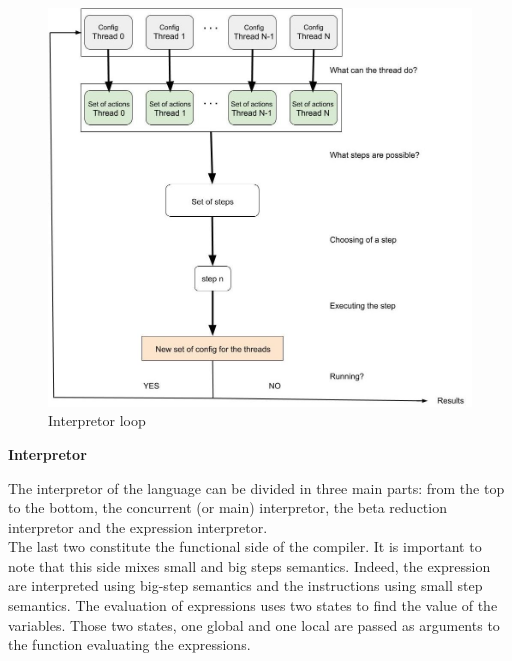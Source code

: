 \documentclass[11pt]{report}
\begin{document}
\begin{figure}[htbp]
\centering
\includegraphics[scale = 0.4]{Interpretor_loop.jpg}
\caption{Interpretor loop}
\end{figure}

\newpage

{}
\centerline{\textbf{\Huge Interpretor}}
\vspace*{15pt}

{}
\vspace*{3pt}
\vspace*{10pt}

\tabto{1cm}The interpretor of the language can be divided in three main parts: from the top to the bottom, the concurrent (or main) interpretor, the beta reduction interpretor and the expression interpretor. \\

\tabto{1cm}The last two constitute the functional side of the compiler. It is important to note that this side mixes small and big steps semantics. Indeed, the expression are interpreted using big-step semantics and the instructions using small step semantics. The evaluation of expressions uses two states to find the value of the variables. Those two states, one global and one local are passed as arguments to the function evaluating the expressions. \\
\end{document}
